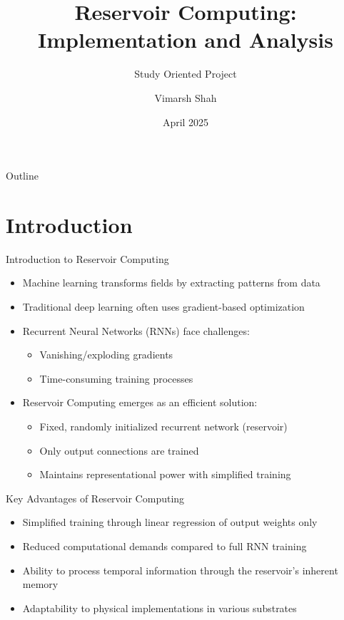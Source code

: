 \documentclass{beamer}
\title{Reservoir Computing: Implementation and Analysis}
\subtitle{Study Oriented Project}
\author{Vimarsh Shah}
\institute{Department of Physics \\ BITS Pilani, Goa}
\date{April 2025}
\begin{document}
\begin{frame}
\titlepage
\end{frame}

\begin{frame}{Outline}
\tableofcontents
\end{frame}

\section{Introduction}

\begin{frame}{Introduction to Reservoir Computing}
\begin{itemize}
\item Machine learning transforms fields by extracting patterns from data
\item Traditional deep learning often uses gradient-based optimization
\item Recurrent Neural Networks (RNNs) face challenges:
    \begin{itemize}
    \item Vanishing/exploding gradients
    \item Time-consuming training processes
    \end{itemize}
\item Reservoir Computing emerges as an efficient solution:
    \begin{itemize}
    \item Fixed, randomly initialized recurrent network (reservoir)
    \item Only output connections are trained
    \item Maintains representational power with simplified training
    \end{itemize}
\end{itemize}
\end{frame}

\begin{frame}{Key Advantages of Reservoir Computing}
\begin{itemize}
\item Simplified training through linear regression of output weights only
\item Reduced computational demands compared to full RNN training
\item Ability to process temporal information through the reservoir's inherent memory
\item Adaptability to physical implementations in various substrates
\end{itemize}
\end{frame}
\end{document}
